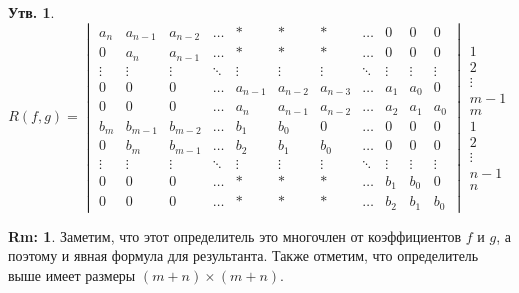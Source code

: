 \documentclass[12pt]{article}
\theoremstyle{definition}
\newtheorem{rem}{Rm:}
\newtheorem{prop}{Утв.}
\begin{document}
\begin{prop}
	$$
		R(f,g) = 
		\begin{vmatrix}
			a_{n} & a_{n-1} & a_{n-2}  & \dotsc   & * & * & * &  \dotsc & 0 & 0 & 0\\
			0 & a_{n} & a_{n-1}  & \dotsc & * & * & * & \dotsc & 0 & 0& 0\\
			\vdots & \vdots  & \vdots & \ddots& \vdots & \vdots &\vdots & \ddots & \vdots & \vdots & \vdots \\
			0 & 0 & 0 & \dotsc & a_{n-1} &  a_{n-2} & a_{n-3}& \dotsc & a_1 & a_0& 0\\
			0 & 0 & 0 & \dotsc & a_n & a_{n-1} & a_{n-2} & \dotsc & a_2 & a_1 & a_0\\
			b_m & b_{m-1} & b_{m-2} & \dotsc & b_1 & b_0 & 0 & \dotsc  & 0 & 0& 0 \\
			0   & b_m & b_{m-1} & \dotsc & b_2 & b_1 & b_0 & \dotsc  & 0 & 0& 0 \\
			\vdots & \vdots  & \vdots & \ddots& \vdots & \vdots &\vdots & \ddots & \vdots & \vdots & \vdots \\
			0 & 0 & 0 & \dotsc & * & * & * & \dotsc & b_1 & b_0 & 0\\
			0 & 0 & 0 & \dotsc & * & * & * & \dotsc & b_2 & b_1 & b_0
		\end{vmatrix}
		\begin{matrix}
			1\\
			2\\
			\vdots \\
			m-1\\
			m\\
			1\\
			2\\
			\vdots \\
			n-1\\
			n
		\end{matrix}
	$$
\end{prop}
\begin{rem}
	Заметим, что этот определитель это многочлен от коэффициентов $f$ и $g$, а поэтому и явная формула для результанта. Также отметим, что определитель выше имеет размеры $(m + n) \times (m + n)$.
\end{rem}
\end{document}
